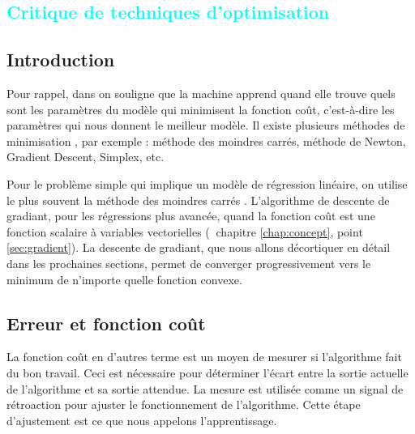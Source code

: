 			


%
%


\textcolor{cyan}{\chapter{Critique de techniques d'optimisation }\label{chap:methode}}	

	\section{Introduction}
		Pour rappel, dans \cite{antoine2018apprentissage} on souligne que la machine apprend quand elle trouve quels sont les paramètres du modèle qui minimisent la fonction coût, c’est-à-dire les paramètres qui nous donnent le meilleur modèle. Il existe plusieurs méthodes de minimisation \cite{jtshiman:2021}, par exemple : méthode des moindres carrés, méthode de Newton, Gradient Descent, Simplex, etc.
		
		Pour le problème simple qui implique un modèle de régression linéaire, on utilise le plus souvent la méthode des moindres carrés \cite{darlington2016regression, matloff2017statistical}. L’algorithme de descente de gradiant, pour les régressions plus avancée, quand la fonction coût est une fonction scalaire à variables vectorielles (\cf $ \ $ chapitre \ref{chap:concept}, point \ref{sec:gradient}). La descente de gradiant, que nous allons décortiquer en détail dans les prochaines sections, permet de converger progressivement vers le minimum de n’importe quelle fonction convexe.
	
	 
	\section{Erreur et fonction coût}
		La fonction coût en d'autres terme est un moyen de mesurer si l'algorithme fait du bon travail. Ceci est nécessaire pour déterminer l'écart entre la sortie actuelle de l'algorithme et sa sortie attendue. La mesure est utilisée comme un signal de rétroaction pour ajuster le fonctionnement de l'algorithme. Cette étape d'ajustement est ce que nous appelons l'apprentissage.
		
